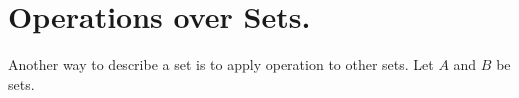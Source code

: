 \section{Operations over Sets.}
Another way to describe a set is to apply operation to other sets. Let $A$ and
$B$ be sets.
%
%


